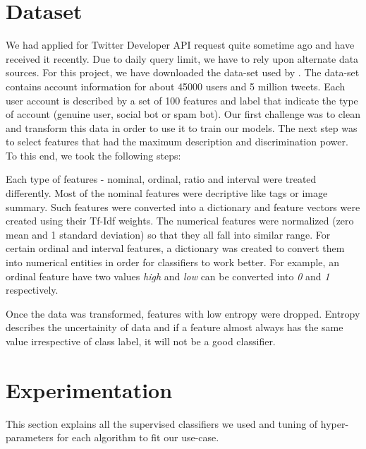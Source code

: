 \documentclass[journal]{IEEEtran}
\begin{document}
\section{Dataset}
We had applied for Twitter Developer API request quite sometime ago and have received it recently. Due to daily query limit, we have to rely upon alternate data sources. For this project, we have downloaded the data-set used by \cite{Data-Set}. The data-set contains account information for about 45000 users and 5 million tweets. Each user account is described by a set of 100 features and label that indicate the type of account (genuine user, social bot or spam bot). Our first challenge was to clean and transform this data in order to use it to train our models. The next step was to select features that had the maximum description and discrimination power. To this end, we took the following steps:
\begin{description}[font=$\bullet$]
	\item Each type of features - nominal, ordinal, ratio and interval were treated differently. Most of the nominal features were decriptive like tags or image summary. Such features were converted into a dictionary and feature vectors were created using their Tf-Idf weights. The numerical features were normalized (zero mean and 1 standard deviation) so that they all fall into similar range. For certain ordinal and interval features, a dictionary was created to convert them into numerical entities in order for classifiers to work better. For example, an ordinal feature have two values \textit{high} and \textit{low} can be converted into \textit{0} and \textit{1} respectively.
	\item Once the data was transformed, features with low entropy were dropped. Entropy describes the uncertainity of data and if a feature almost always has the same value irrespective of class label, it will not be a good classifier.
\end{description}


\section{Experimentation}

This section explains all the supervised classifiers we used and tuning of hyper-parameters for each algorithm to fit our use-case.
\end{document}
